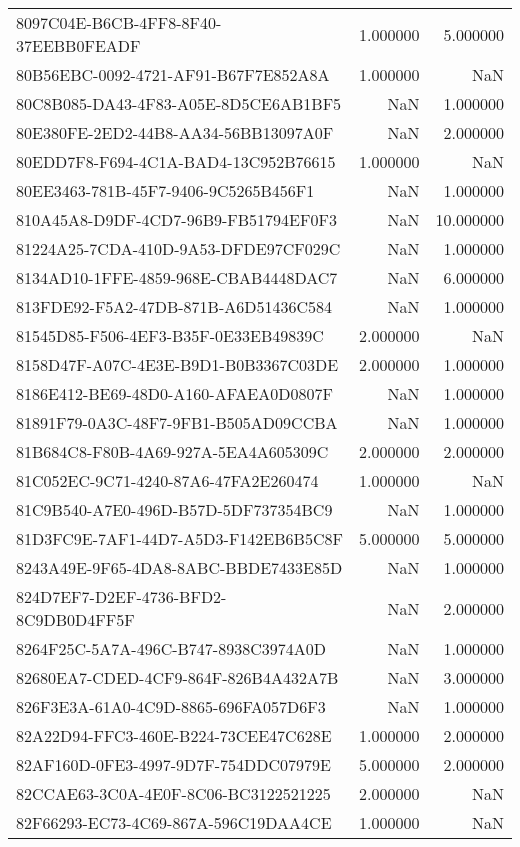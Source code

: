 \begin{tabular}{lrr}
8097C04E-B6CB-4FF8-8F40-37EEBB0FEADF & 1.000000 & 5.000000 \\
80B56EBC-0092-4721-AF91-B67F7E852A8A & 1.000000 & NaN \\
80C8B085-DA43-4F83-A05E-8D5CE6AB1BF5 & NaN & 1.000000 \\
80E380FE-2ED2-44B8-AA34-56BB13097A0F & NaN & 2.000000 \\
80EDD7F8-F694-4C1A-BAD4-13C952B76615 & 1.000000 & NaN \\
80EE3463-781B-45F7-9406-9C5265B456F1 & NaN & 1.000000 \\
810A45A8-D9DF-4CD7-96B9-FB51794EF0F3 & NaN & 10.000000 \\
81224A25-7CDA-410D-9A53-DFDE97CF029C & NaN & 1.000000 \\
8134AD10-1FFE-4859-968E-CBAB4448DAC7 & NaN & 6.000000 \\
813FDE92-F5A2-47DB-871B-A6D51436C584 & NaN & 1.000000 \\
81545D85-F506-4EF3-B35F-0E33EB49839C & 2.000000 & NaN \\
8158D47F-A07C-4E3E-B9D1-B0B3367C03DE & 2.000000 & 1.000000 \\
8186E412-BE69-48D0-A160-AFAEA0D0807F & NaN & 1.000000 \\
81891F79-0A3C-48F7-9FB1-B505AD09CCBA & NaN & 1.000000 \\
81B684C8-F80B-4A69-927A-5EA4A605309C & 2.000000 & 2.000000 \\
81C052EC-9C71-4240-87A6-47FA2E260474 & 1.000000 & NaN \\
81C9B540-A7E0-496D-B57D-5DF737354BC9 & NaN & 1.000000 \\
81D3FC9E-7AF1-44D7-A5D3-F142EB6B5C8F & 5.000000 & 5.000000 \\
8243A49E-9F65-4DA8-8ABC-BBDE7433E85D & NaN & 1.000000 \\
824D7EF7-D2EF-4736-BFD2-8C9DB0D4FF5F & NaN & 2.000000 \\
8264F25C-5A7A-496C-B747-8938C3974A0D & NaN & 1.000000 \\
82680EA7-CDED-4CF9-864F-826B4A432A7B & NaN & 3.000000 \\
826F3E3A-61A0-4C9D-8865-696FA057D6F3 & NaN & 1.000000 \\
82A22D94-FFC3-460E-B224-73CEE47C628E & 1.000000 & 2.000000 \\
82AF160D-0FE3-4997-9D7F-754DDC07979E & 5.000000 & 2.000000 \\
82CCAE63-3C0A-4E0F-8C06-BC3122521225 & 2.000000 & NaN \\
82F66293-EC73-4C69-867A-596C19DAA4CE & 1.000000 & NaN \\

\end{tabular}
